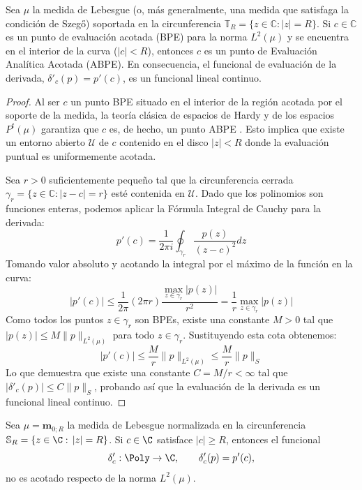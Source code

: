 \begin{lem}
	\label{lema:ABPE_derivada}
	Sea $\mu$ la medida de Lebesgue (o, más generalmente, una medida que satisfaga la condición de Szegő) soportada en la circunferencia $\mathbb{T}_R = \{z \in \mathbb{C} : |z| = R\}$. Si $c \in \mathbb{C}$ es un punto de evaluación acotada (BPE) para la norma $L^2(\mu)$ y se encuentra en el interior de la curva ($|c| < R$), entonces $c$ es un punto de Evaluación Analítica Acotada (ABPE). En consecuencia, el funcional de evaluación de la derivada, $\delta'_c(p) = p'(c)$, es un funcional lineal continuo.
\end{lem}

\begin{proof}
	Al ser $c$ un punto BPE situado en el interior de la región acotada por el soporte de la medida, la teoría clásica de espacios de Hardy y de los espacios $P^t(\mu)$ garantiza que $c$ es, de hecho, un punto ABPE \cite{miller1999bounded,aleman2009nontangential}. Esto implica que existe un entorno abierto $\mathcal{U}$ de $c$ contenido en el disco $|z| < R$ donde la evaluación puntual es uniformemente acotada.

	Sea $r > 0$ suficientemente pequeño tal que la circunferencia cerrada $\gamma_r = \{z \in \mathbb{C} : |z-c| = r\}$ esté contenida en $\mathcal{U}$. Dado que los polinomios son funciones enteras, podemos aplicar la Fórmula Integral de Cauchy para la derivada:
	\[
		p'(c) = \frac{1}{2\pi i} \oint_{\gamma_r} \frac{p(z)}{(z-c)^2} dz
	\]
	Tomando valor absoluto y acotando la integral por el máximo de la función en la curva:
	\[
		|p'(c)| \le \frac{1}{2\pi} \left( 2\pi r \right) \frac{\max_{z \in \gamma_r} |p(z)|}{r^2} = \frac{1}{r} \max_{z \in \gamma_r} |p(z)|
	\]
	Como todos los puntos $z \in \gamma_r$ son BPEs, existe una constante $M > 0$ tal que $|p(z)| \le M \|p\|_{L^2(\mu)}$ para todo $z \in \gamma_r$. Sustituyendo esta cota obtenemos:
	\[
		|p'(c)| \le \frac{M}{r} \|p\|_{L^2(\mu)} \le \frac{M}{r} \|p\|_S
	\]
	Lo que demuestra que existe una constante $C = M/r < \infty$ tal que $|\delta'_c(p)| \le C \|p\|_S$, probando así que la evaluación de la derivada es un funcional lineal continuo.
\end{proof}

\begin{lem}
	\label{lem:no_acotacion_derivada_exterior_lebesgue}
	Sea $\mu=\mathbf m_{0;R}$ la medida de Lebesgue normalizada en la circunferencia
	$\mathbb{S}_R=\{z\in\C:\,|z|=R\}$. Si $c\in\C$ satisface $|c|\ge R$, entonces el funcional
	\[
		\delta'_c:\Poly\to\C,
		\qquad
		\delta'_c(p)=p'(c),
	\]
	no es acotado respecto de la norma $L^2(\mu)$.
\end{lem}

